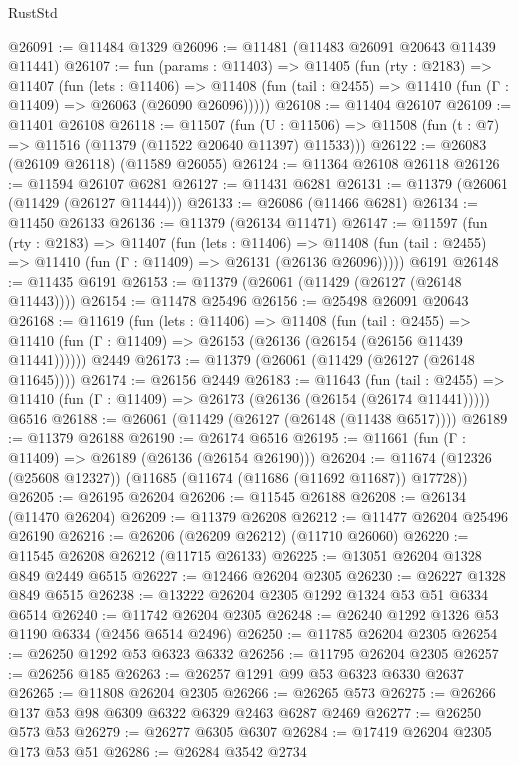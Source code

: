 \begin{lexlean}{RustStd}
\begin{coremodule}
@26091 := @11484 @1329
@26096 := @11481 (@11483 @26091 @20643 @11439 @11441)
@26107 := fun (params : @11403) =>
  @11405
    (fun (rty : @2183) =>
    @11407
      (fun (lets : @11406) =>
      @11408 (fun (tail : @2455) => @11410 (fun (Γ : @11409) => @26063 (@26090 @26096)))))
@26108 := @11404 @26107
@26109 := @11401 @26108
@26118 := @11507
    (fun (U : @11506) => @11508 (fun (t : @7) => @11516 (@11379 (@11522 @20640 @11397) @11533)))
@26122 := @26083 (@26109 @26118) (@11589 @26055)
@26124 := @11364 @26108 @26118
@26126 := @11594 @26107 @6281
@26127 := @11431 @6281
@26131 := @11379 (@26061 (@11429 (@26127 @11444)))
@26133 := @26086 (@11466 @6281)
@26134 := @11450 @26133
@26136 := @11379 (@26134 @11471)
@26147 := @11597
    (fun (rty : @2183) =>
    @11407
      (fun (lets : @11406) =>
      @11408 (fun (tail : @2455) => @11410 (fun (Γ : @11409) => @26131 (@26136 @26096)))))
    @6191
@26148 := @11435 @6191
@26153 := @11379 (@26061 (@11429 (@26127 (@26148 @11443))))
@26154 := @11478 @25496
@26156 := @25498 @26091 @20643
@26168 := @11619
    (fun (lets : @11406) =>
    @11408
      (fun (tail : @2455) =>
      @11410 (fun (Γ : @11409) => @26153 (@26136 (@26154 (@26156 @11439 @11441))))))
    @2449
@26173 := @11379 (@26061 (@11429 (@26127 (@26148 @11645))))
@26174 := @26156 @2449
@26183 := @11643
    (fun (tail : @2455) => @11410 (fun (Γ : @11409) => @26173 (@26136 (@26154 (@26174 @11441)))))
    @6516
@26188 := @26061 (@11429 (@26127 (@26148 (@11438 @6517))))
@26189 := @11379 @26188
@26190 := @26174 @6516
@26195 := @11661 (fun (Γ : @11409) => @26189 (@26136 (@26154 @26190)))
@26204 := @11674 (@12326 (@25608 @12327)) (@11685 (@11674 (@11686 (@11692 @11687)) @17728))
@26205 := @26195 @26204
@26206 := @11545 @26188
@26208 := @26134 (@11470 @26204)
@26209 := @11379 @26208
@26212 := @11477 @26204 @25496 @26190
@26216 := @26206 (@26209 @26212) (@11710 @26060)
@26220 := @11545 @26208 @26212 (@11715 @26133)
@26225 := @13051 @26204 @1328 @849 @2449 @6515
@26227 := @12466 @26204 @2305
@26230 := @26227 @1328 @849 @6515
@26238 := @13222 @26204 @2305 @1292 @1324 @53 @51 @6334 @6514
@26240 := @11742 @26204 @2305
@26248 := @26240 @1292 @1326 @53 @1190 @6334 (@2456 @6514 @2496)
@26250 := @11785 @26204 @2305
@26254 := @26250 @1292 @53 @6323 @6332
@26256 := @11795 @26204 @2305
@26257 := @26256 @185
@26263 := @26257 @1291 @99 @53 @6323 @6330 @2637
@26265 := @11808 @26204 @2305
@26266 := @26265 @573
@26275 := @26266 @137 @53 @98 @6309 @6322 @6329 @2463 @6287 @2469
@26277 := @26250 @573 @53
@26279 := @26277 @6305 @6307
@26284 := @17419 @26204 @2305 @173 @53 @51
@26286 := @26284 @3542 @2734

\end{coremodule}
\end{lexlean}
